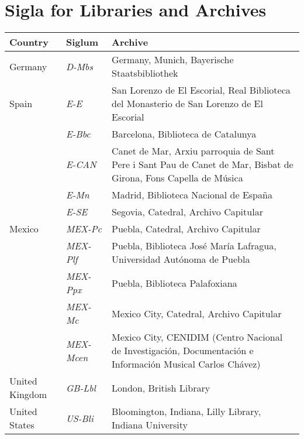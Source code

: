 \section*{Sigla for Libraries and Archives}

\begin{tabulary}{\linewidth}{llL}
    \toprule
    Country
    & Siglum
    & Archive\\
    \midrule

    Germany 
    & \emph{D-Mbs}
    & Germany, Munich, Bayerische Staatsbibliothek\\
    \addlinespace

    Spain 
    & \emph{E-E}
    & San Lorenzo de El Escorial, 
    Real Biblioteca del Monasterio de San Lorenzo de El Escorial\\ 

    & \emph{E-Bbc}
    & Barcelona, Biblioteca de Catalunya\\

    & \emph{E-CAN}
    & Canet de Mar, Arxiu parroquia de Sant Pere i Sant Pau 
    de Canet de Mar, Bisbat de Girona, Fons Capella de Música\\

    & \emph{E-Mn}
    & Madrid, Biblioteca Nacional de España\\

    & \emph{E-SE}
    & Segovia, Catedral, Archivo Capitular\\
    \addlinespace

    Mexico
    & \emph{MEX-Pc}
    & Puebla, Catedral, Archivo Capitular\\

    & \emph{MEX-Plf}
    & Puebla, Biblioteca José María Lafragua, Universidad Autónoma de Puebla\\

    & \emph{MEX-Ppx}
    & Puebla, Biblioteca Palafoxiana\\

    & \emph{MEX-Mc}
    & Mexico City, Catedral, Archivo Capitular\\

    & \emph{MEX-Mcen}
    & Mexico City, CENIDIM (Centro Nacional de Investigación, 
    Documentación e Información Musical Carlos Chávez)\\
    \addlinespace

    United Kingdom 
    & \emph{GB-Lbl}
    & London, British Library\\
    \addlinespace

    United States
    & \emph{US-Bli}
    & Bloomington, Indiana, Lilly Library, Indiana University\\
    \bottomrule
\end{tabulary}

